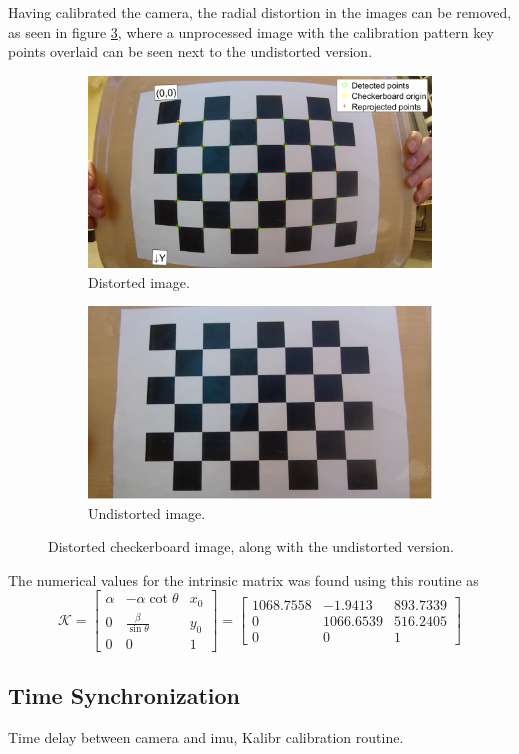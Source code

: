 Having calibrated the camera, the radial distortion in the images can be removed, as seen in figure \ref{fig:distortion}, where a unprocessed image with the calibration pattern key points overlaid can be seen next to the undistorted version.
\begin{figure}[H]
	\centering
	\begin{subfigure}{.5\textwidth}
		\centering
		\includegraphics[width=.8\linewidth]{fig/calibration_distorted.PNG}
		\caption{Distorted image.}
		\label{fig:sub_distort1}
	\end{subfigure}%
	\begin{subfigure}{.5\textwidth}
		\centering
		\includegraphics[width=.8\linewidth]{fig/calibration_undistorted.PNG}
		\caption{Undistorted image.}
		\label{fig:sub_distort2}
	\end{subfigure}
	\caption{Distorted checkerboard image, along with the undistorted version.}
	\label{fig:distortion}
\end{figure}
The numerical values for the intrinsic matrix was found using this routine as
\begin{equation}
\mathcal{K}=\begin{bmatrix}\alpha & -\alpha\cot{\theta} & x_0\\0 & \frac{\beta}{\sin{\theta}} & y_0\\0 & 0 & 1\end{bmatrix}=\begin{bmatrix}
1068.7558 & -1.9413 & 893.7339 \\ 0 & 1066.6539 &516.2405\\ 0 & 0 & 1
\end{bmatrix}
\end{equation}  
\subsection{Time Synchronization}
Time delay between camera and imu, Kalibr calibration routine.
\cleardoublepage